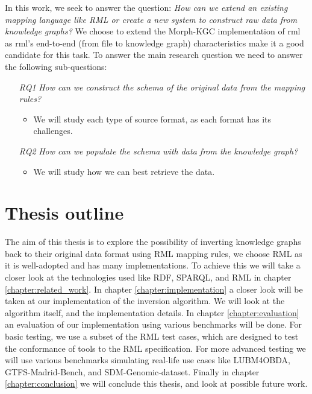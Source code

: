 In this work, we seek to answer the question: \textit{How can we extend an existing mapping language like RML or create a new system to construct raw data from knowledge graphs?} We choose to extend the Morph-KGC implementation \citep{arenas2022morph} of \acrshort{rml} \citep{dimou_ldow_2014} as \acrshort{rml}'s end-to-end (from file to knowledge graph) characteristics make it a good candidate for this task. To answer the main research question we need to answer the following sub-questions:
\begin{itemize}
    \item[\textit{RQ1}] \textit{How can we construct the schema of the original data from the mapping rules?}
    \begin{itemize}
        \item We will study each type of source format, as each format has its challenges.
    \end{itemize}
    \item[\textit{RQ2}] \textit{How can we populate the schema with data from the knowledge graph?}
    \begin{itemize}
        \item We will study how we can best retrieve the data.
    \end{itemize}
\end{itemize}

\section{Thesis outline}
The aim of this thesis is to explore the possibility of inverting knowledge graphs back to their original data format using RML mapping rules, we choose RML as it is well-adopted and has many implementations. To achieve this we will take a closer look at the technologies used like RDF, SPARQL, and RML in chapter \ref{chapter:related_work}. 
In chapter \ref{chapter:implementation} a closer look will be taken at our implementation of the inversion algorithm. We will look at the algorithm itself, and the implementation details. 
In chapter \ref{chapter:evaluation} an evaluation of our implementation using various benchmarks will be done. For basic testing, we use a subset of the RML test cases, which are designed to test the conformance of tools to the RML specification. For more advanced testing we will use various benchmarks simulating real-life use cases like LUBM4OBDA, GTFS-Madrid-Bench, and SDM-Genomic-dataset.
Finally in chapter \ref{chapter:conclusion} we will conclude this thesis, and look at possible future work.

